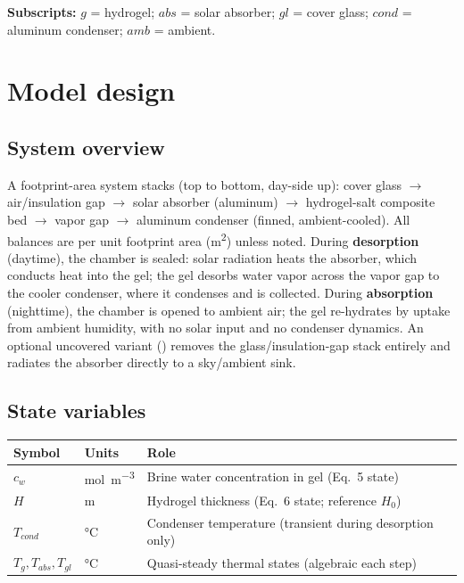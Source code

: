 \documentclass[11pt]{article}
\newcommand{\code}[1]{\texttt{\seqsplit{#1}}}
\begin{document}
\textbf{Subscripts:} $g$ = hydrogel; $abs$ = solar absorber; $gl$ = cover glass; $cond$ =
aluminum condenser; $amb$ = ambient.

\tableofcontents

\section{Model design}

\subsection{System overview}

A footprint-area system stacks (top to bottom, day-side up): cover glass $\to$ air/insulation
gap $\to$ solar absorber (aluminum) $\to$ hydrogel-salt composite bed $\to$ vapor gap $\to$
aluminum condenser (finned, ambient-cooled). All balances are per unit footprint area
(\si{\metre\squared}) unless noted. During \textbf{desorption} (daytime), the chamber is
sealed: solar radiation heats the absorber, which conducts heat into the gel; the gel desorbs
water vapor across the vapor gap to the cooler condenser, where it condenses and is collected.
During \textbf{absorption} (nighttime), the chamber is opened to ambient air; the gel re-hydrates
by uptake from ambient humidity, with no solar input and no condenser dynamics. An optional
uncovered variant (\code{has\_glass=False}) removes the glass/insulation-gap stack entirely and
radiates the absorber directly to a sky/ambient sink.

\subsection{State variables}

\begin{table}[h]
\centering
\small
\begin{tabular}{@{}lll@{}}
\toprule
\textbf{Symbol} & \textbf{Units} & \textbf{Role} \\
\midrule
$c_w$ & \si{\mol\per\cubic\metre} & Brine water concentration in gel (Eq.~5 state) \\
$H$ & \si{\metre} & Hydrogel thickness (Eq.~6 state; reference $H_0$) \\
$T_{cond}$ & \si{\celsius} & Condenser temperature (transient during desorption only) \\
$T_g, T_{abs}, T_{gl}$ & \si{\celsius} & Quasi-steady thermal states (algebraic each step) \\
\bottomrule
\end{tabular}
\end{table}
\end{document}
